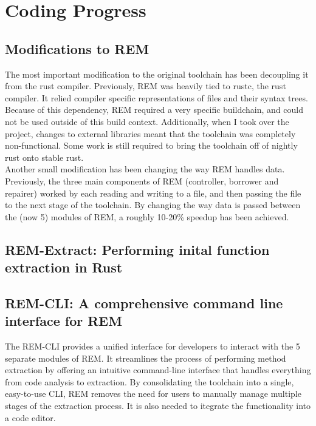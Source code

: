 \section{Coding Progress}

\subsection*{Modifications to REM}

The most important modification to the original toolchain has been decoupling it
from the rust compiler. Previously, REM was heavily tied to rustc, the rust
compiler. It relied compiler specific representations of files and their syntax
trees. Because of this dependency, REM required a very specific buildchain, and
could not be used outside of this build context. Additionally, when I took over
the project, changes to external libraries meant that the toolchain was
completely non-functional. Some work is still required to bring the toolchain
off of nightly rust onto stable rust.\\
Another small modification has been changing the way REM handles data.
Previously, the three main components of REM (controller, borrower and repairer)
worked by each reading and writing to a file, and then passing the file to the
next stage of the toolchain. By changing the way data is passed between the (now
5) modules of REM, a roughly 10-20\% speedup has been achieved.

\subsection*{REM-Extract: Performing inital function extraction in Rust}

\subsection*{REM-CLI: A comprehensive command line interface for REM}

The REM-CLI provides a unified interface for developers to interact with the
5 separate modules of REM. It streamlines the process of performing method
extraction by offering an intuitive command-line interface that handles
everything from code analysis to extraction. By consolidating the toolchain into
a single, easy-to-use CLI, REM removes the need for users to manually manage
multiple stages of the extraction process. It is also needed to itegrate the
functionality into a code editor.

